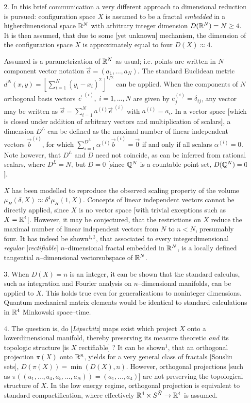 \documentclass[pra,amssymb,twocolumn]{revtex4}
\begin{document}
2.
In this brief communication a very different approach to
dimensional reduction is pursued:
configuration space $X$ is assumed to be a fractal
{\it embedded} in a higherdimensional space ${\Bbb R}^N$
with arbitrary integer
dimension $D({\Bbb R}^N)=N\ge 4$.
It is then assumed, that due to some [yet unknown]
mechanism, the dimension of the configuration space $X$ is approximately
equal to four $D(X)\approx 4$.


Assumed is a parametrization of ${\Bbb R}^N$ as usual;
i.e. points are written in $N$--component vector notation
$\vec a=(a_1,\ldots ,a_N)$.
The standard Euclidean metric $d^N(x,y)=[\sum_{i=1}^N(y_i-x_i)^2]^{1/2}$
can be applied.
When the components of $N$ orthogonal basis vectors $\vec e^{\; (i)},
\; i=1,\ldots ,N$ are given by $e^{(i)}_j=\delta_{ij}$,
any vector may be written as $\vec a=\sum_{i=1}^Na^{(i)}\vec e^{\; (i)}$
with $a^{(i)}=a_i$.
In a vector space [which is closed under addition of arbitrary vectors
and multiplication of scalars], a dimension $D^L$ can be defined as the
maximal number of linear independent vectors $\vec b^{(i)}$,
for which $\sum_{i=1}^{D^L}\alpha^{(i)}\vec b^{(i)}=\vec 0$ if and only
if all scalars $\alpha^{(i)}=0$. Note however, that $D^L$ and $D$
need not coincide, as can be inferred from
rational scalars, where $D^L=N$, but $D=0$
[since ${\Bbb Q}^N$ is a countable point set, $D({\Bbb Q}^N)=0$].


$X$ has been modelled to reproduce the observed scaling
property of the volume $\mu_H(\delta , X)\approx \delta^4\mu_H
(1,X)$.
Concepts of linear independent vectors cannot be directly applied,
since $X$ is no vector space [with trivial exceptions such as $X={\Bbb R}^4$].
However, it may be conjectured, that the restrictions on $X$
reduce the maximal number of linear independent vectors from
$N$ to $n<N$, presumably four.
It has indeed be shown$^{1,3}$, that associated to every integerdimensional
{\it regular}
[{\it rectifiable}] $n$--dimensional fractal
embedded in ${\Bbb R}^N$, is a locally defined tangential $n$--dimensional
vectorsubspace of ${\Bbb R}^N$.


3.
When $D(X)=n$ is an integer, it can be shown \cite{WarrenSiegel}
that the standard calculus, such as integration and Fourier
analysis on $n$--dimensional manifolds, can be applied to $X$.
This holds true even for generalizations to noninteger
dimensions.
Quantum mechanical matrix elements would be identical
to standard calculations in ${\Bbb R}^4$ Minkowski space--time.


4.
The question is, do [{\it Lipschitz}] maps exist which project
$X$ onto a lowerdimensional manifold,
thereby preserving its measure theoretic {\it and} its
topologic structure [is $X$ rectifiable] ?
It can be shown$^1$,
that an orthogonal projection $\pi (X)$ onto ${\Bbb R}^n$,
yields for a very general class of fractals [Souslin sets],
$D(\pi (X))=\min (D(X),n)$.
However, orthogonal projections [such as
$\pi ((a_1,\ldots ,a_4,a_5,\ldots ,a_N))=(a_1,\ldots ,a_4)$]
are not preserving the topological structure of $X$.
In the low energy regime, orthogonal projection is
equivalent to standard compactification,
where effectively ${\Bbb R}^4\times S^{\bar N}\rightarrow {\Bbb R}^4$ is assumed.
\end{document}
